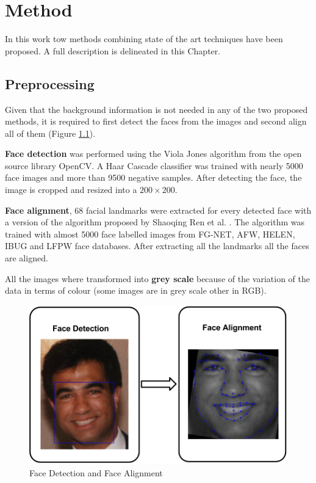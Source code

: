 \chapter{Method} \label{chap:method}
In this work tow methods combining state of the art techniques have been proposed. A full description is delineated in this Chapter.

\section{Preprocessing}

Given that the background information is not needed in any of the two proposed methods, it is required to first detect the faces from the images and second align all of them (Figure \ref{fig:preprocessing}).

\textbf{Face detection} was performed using the Viola Jones algorithm from the open source library OpenCV. A Haar Cascade classifier was trained with nearly 5000 face images and more than 9500 negative samples. After detecting the face, the image is cropped and resized into a $200 \times 200$.

\textbf{Face alignment}, 68 facial landmarks were extracted for every detected face with a version of the algorithm proposed by Shaoqing Ren et al. \cite{ren2014face}. The algorithm was trained with almost 5000 face labelled images from FG-NET, AFW, HELEN, IBUG and LFPW face databases. After extracting all the landmarks all the faces are aligned.

All the images where transformed into \textbf{grey scale} because of the variation of the data in terms of colour (some images are in grey scale other in RGB).

\begin{figure}[!h]
	\centering
	\includegraphics[width=\textwidth]{figures/preprocessing}
	\caption{Face Detection and Face Alignment}
	\label{fig:preprocessing}
\end{figure}


